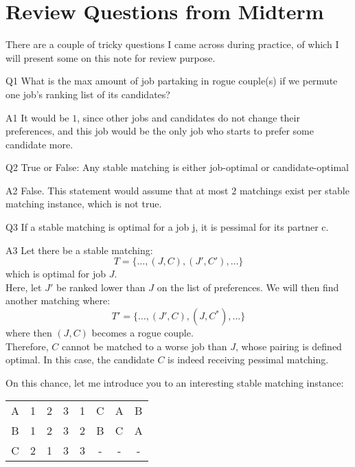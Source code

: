 \section{Review Questions from Midterm}
There are a couple of tricky questions I came across during practice, of which I will present some on this note for review purpose. \\
\begin{bindenum}
    \item[Q1] {
        What is the max amount of job partaking in rogue couple(s) if we permute one job's ranking list of its candidates?
    }
    \item[A1] {
        It would be $1$, since other jobs and candidates do not change their preferences, and this job would be the only job who starts to prefer some candidate more.
    }
\end{bindenum}
\begin{bindenum}
    \item[Q2] {
        True or False: Any stable matching is either job-optimal or candidate-optimal
    }
    \item[A2] {
        False. This statement would assume that at most $2$ matchings exist per stable matching instance, which is not true.
    }
\end{bindenum}
\begin{bindenum}
    \item[Q3] {
        If a stable matching is optimal for a job j, it is pessimal for its partner c.
    }
    \item[A3] {
        Let there be a stable matching:
        \[T = \{\dots, (J, C), (J', C'), \dots\}\]
        which is optimal for job $J$. \\
        Here, let $J'$ be ranked lower than $J$ on the list of preferences. We will then find another matching where:
        \[
            T' = \{\dots, (J', C), (J, C^*), \dots\}
        \]
        where then $(J, C)$ becomes a rogue couple. \\
        Therefore, $C$ cannot be matched to a worse job than $J$, whose pairing is defined optimal. In this case, the candidate $C$ is indeed receiving pessimal matching.
    }
\end{bindenum}
On this chance, let me introduce you to an interesting stable matching instance:
\begin{center}
    \begin{tabular}{|c|ccc||c|ccc|}
        A & 1 & 2 & 3 & 1 & C & A & B \\
        B & 1 & 2 & 3 & 2 & B & C & A \\
        C & 2 & 1 & 3 & 3 & - & - & -
    \end{tabular}
\end{center}
